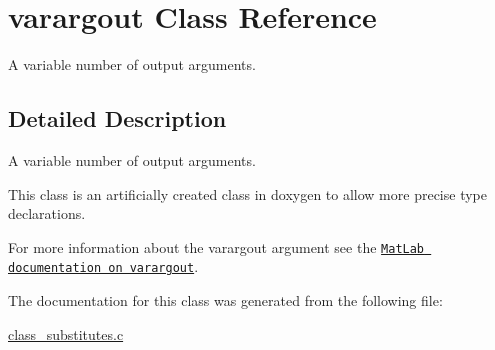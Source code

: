 \hypertarget{a00015}{\section{varargout Class Reference}
\label{a00015}
}


A variable number of output arguments.  




\subsection{Detailed Description}
A variable number of output arguments. 

This class is an artificially created class in doxygen to allow more precise type declarations.

For more information about the varargout argument see the \href{http://www.mathworks.de/help/techdoc/ref/varargout.html}{\tt Mat\-Lab documentation on varargout}. 

The documentation for this class was generated from the following file\-:\begin{DoxyCompactItemize}
\item 
\hyperlink{a00016}{class\-\_\-substitutes.\-c}\end{DoxyCompactItemize}
